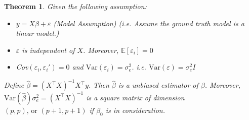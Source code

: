 \documentclass{article}
\theoremstyle{MyNonumberplain}
\theoremstyle{break}
\newcommand{\ve}{\varepsilon}
\newcommand{\ev}{\mathbb{E}}
\newcommand{\var}{\text{Var}}
\newcommand{\T}{^\intercal}
\newcommand{\bt}[1]{\beta_{#1}}
\theoremstyle{break}
\newtheorem{theorem}{Theorem}[section]
\theoremstyle{break}
\theoremstyle{break}
\begin{document}
\begin{thmbox}
    \begin{theorem}
        Given the following assumption:

        \begin{itemize}
            \medskip
            \item $y=X\beta+\ve$ (Model Assumption) (i.e. Assume the ground truth model is a linear model.)
            \medskip
            \item $\ve$ is independent of $X$. Moreover, $\ev[\ve_i]=0$
            \medskip
            \item Cov$(\ve_i, \ve_i')=0$ and $\var(\ve_i)=\sigma_e^2$. i.e. $\var(\ve)=\sigma_e^2I$
        \end{itemize}
        \medskip
        Define $\hat{\beta}=(X\T X)^{-1}X\T y$. Then $\hat\beta$ is a unbiased estimator of $\beta$.
        Moreover, $\var(\hat\beta)\sigma_e^2 = (X\T X)^{-1}$ is a square matrix of dimension $(p,p) \text{, or } (p+1,p+1)$ if $\bt{0}$ is in consideration.
    \end{theorem}
\end{thmbox} 
\end{document}
